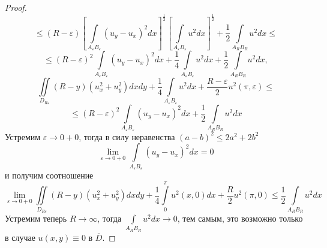 \documentclass[a4paper, 12pt]{article}
\numberwithin{equation}{section}
\numberwithin{lemma}{section}
\numberwithin{definition}{section}
\numberwithin{notabene}{section}
\numberwithin{corollary}{section}
\begin{document}
\begin{proof}
\begin{equation*}
 	\end{equation*}
 	\begin{equation*}
	 		\leq \left(R - \varepsilon\right) \left[\int\limits_{A_\varepsilon B_\varepsilon} \left( u_y - u_x\right)^2 dx \right]^{\frac12} \left[\int\limits_{A_\varepsilon B_\varepsilon} u^2 dx \right]^{\frac12} + \dfrac12 \int\limits_{A_RB_R} u^2 dx \leq
 	\end{equation*}
 	\begin{equation*}
 		\leq \left(R - \varepsilon\right)^2 \int\limits_{A_\varepsilon B_\varepsilon} \left( u_y - u_x\right)^2 dx + \dfrac14 \int\limits_{A_\varepsilon B_\varepsilon} u^2 dx +\dfrac12 \int\limits_{A_RB_R} u^2 dx, 
 	\end{equation*}
 	\begin{equation*}
 			\iint\limits_{D_{R\varepsilon}} \left(R - y\right) \left(u_x^2 + u_y^2\right) dx dy + \dfrac{1}{4}\int\limits_{A_\varepsilon B_\varepsilon} u^2 dx +\dfrac{R - \varepsilon}{2}u^2(\pi, \varepsilon) \leq 
 	\end{equation*}
 	\begin{equation*}
 		 \leq \left(R - \varepsilon\right)^2 \int\limits_{A_\varepsilon B_\varepsilon} \left( u_y - u_x\right)^2 dx  +\dfrac12 \int\limits_{A_RB_R} u^2 dx
 \end{equation*}
	Устремим $\varepsilon \to 0 + 0$, тогда в силу неравенства $(a-b)^2 \leq 2a^2 + 2b^2$
	\begin{equation*}
		\lim\limits_{\varepsilon \to 0 + 0} \int\limits_{A_\varepsilon B_\varepsilon} \left(u_y - u_x\right)^2 dx = 0
	\end{equation*}
	и получим соотношение
	\begin{equation*}
		\lim\limits_{\varepsilon \to 0 + 0} \iint\limits_{D_{R\varepsilon}} \left(R - y\right) \left(u_x^2 + u_y^2 \right) dx dy + \dfrac14 \int\limits_0^\pi u^2(x,0) dx + \dfrac{R}{2}u^2(\pi,0) \leq \dfrac12 \int\limits_{A_RB_R} u^2 dx
	\end{equation*}
	Устремим теперь $R \to \infty$, тогда $\int\limits_{A_RB_R} u^2 dx \to 0$, тем самым, это возможно только в случае $u(x,y) \equiv 0$ в $\overline{D}$. \newline
	

\end{proof}
\end{document}
